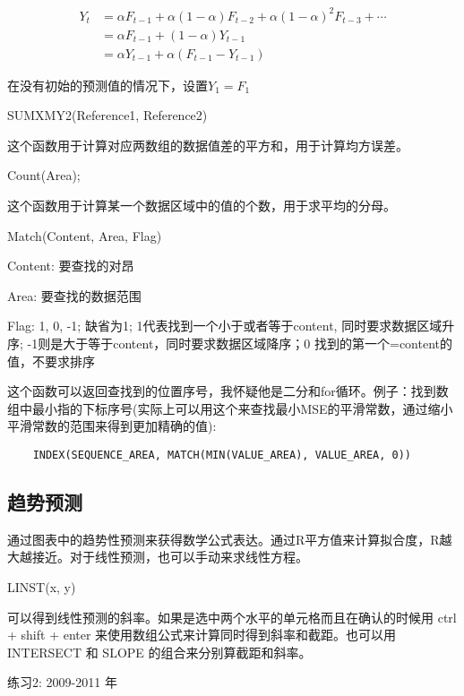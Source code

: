 \documentclass[10pt, a4paper]{article}
\begin{document}
        \begin{align*}
            Y_t &= \alpha F_{t - 1} + \alpha(1 - \alpha) F_{t - 2} + \alpha(1 - \alpha)^2 F_{t - 3} + \cdots \\
            & = \alpha F_{t - 1} + (1 - \alpha)Y_{t - 1} \\
            & = \alpha Y_{t - 1} + \alpha(F_{t-1} - Y_{t - 1})  
        \end{align*}

        在没有初始的预测值的情况下，设置$Y_1 = F_1$

        \begin{center}
            SUMXMY2(Reference1, Reference2)
        \end{center}
        
        这个函数用于计算对应两数组的数据值差的平方和，用于计算均方误差。

        \begin{center}
            Count(Area);
        \end{center}
        
        这个函数用于计算某一个数据区域中的值的个数，用于求平均的分母。

        \begin{center}
            Match(Content, Area, Flag)
        \end{center}

        \quad Content: 要查找的对昂
        
        \quad Area: 要查找的数据范围
        
        \quad Flag: 1, 0, -1; 缺省为1; 1代表找到一个小于或者等于content, 同时要求数据区域升序; -1则是大于等于content，同时要求数据区域降序；0 找到的第一个=content的值，不要求排序

        这个函数可以返回查找到的位置序号，我怀疑他是二分和for循环。例子：找到数组中最小指的下标序号(实际上可以用这个来查找最小MSE的平滑常数，通过缩小平滑常数的范围来得到更加精确的值): 
\begin{lstlisting}
    INDEX(SEQUENCE_AREA, MATCH(MIN(VALUE_AREA), VALUE_AREA, 0)) 
\end{lstlisting}

    \subsection{趋势预测}
        通过图表中的趋势性预测来获得数学公式表达。通过R平方值来计算拟合度，R越大越接近。对于线性预测，也可以手动来求线性方程。 
        \begin{center}
            LINST(x, y)
        \end{center}

        可以得到线性预测的斜率。如果是选中两个水平的单元格而且在确认的时候用 ctrl + shift + enter 来使用数组公式来计算同时得到斜率和截距。也可以用 INTERSECT 和 SLOPE 的组合来分别算截距和斜率。 
        
        练习2: 2009-2011 年
        
\end{document}
